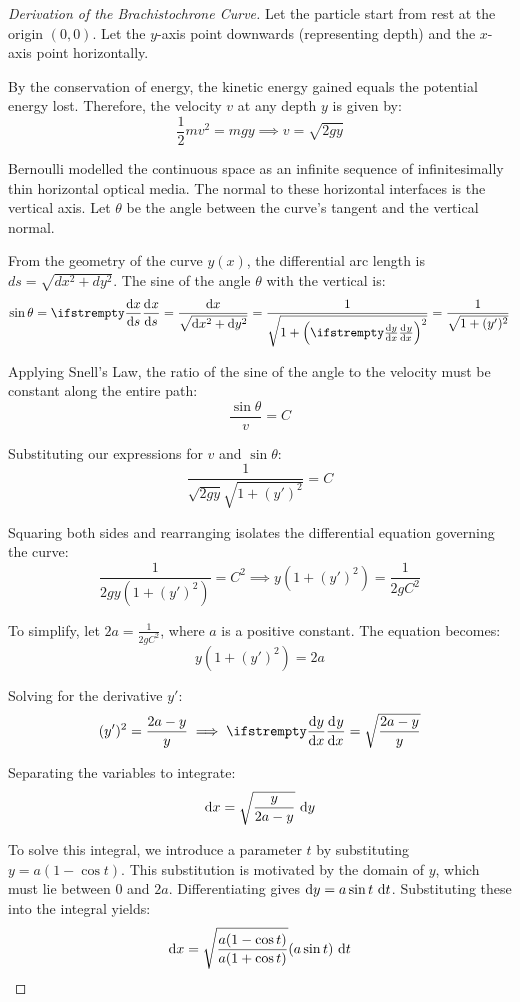 \documentclass[../analysis1.tex]{subfiles}
\begin{document}
\begin{proof}[Derivation of the Brachistochrone Curve]
    Let the particle start from rest at the origin $(0,0)$. Let the $y$-axis point downwards (representing depth) and the $x$-axis point horizontally. 
    
    By the conservation of energy, the kinetic energy gained equals the potential energy lost. Therefore, the velocity $v$ at any depth $y$ is given by:
    \[ \frac{1}{2}mv^2 = mgy \implies v = \sqrt{2gy} \]
    
    Bernoulli modelled the continuous space as an infinite sequence of infinitesimally thin horizontal optical media. The normal to these horizontal interfaces is the vertical axis. Let $\theta$ be the angle between the curve's tangent and the vertical normal. 
    
    From the geometry of the curve $y(x)$, the differential arc length is $ds = \sqrt{dx^2 + dy^2}$. The sine of the angle $\theta$ with the vertical is:
    \[ \sin \theta = \deriv[]{x}{s} = \frac{\d x}{\sqrt{\d x^2 + \d y^2}} = \frac{1}{\sqrt{1 + \left(\deriv[]{y}{x}\right)^2}} = \frac{1}{\sqrt{1 + (y')^2}} \]
    
    Applying Snell's Law, the ratio of the sine of the angle to the velocity must be constant along the entire path:
    \[ \frac{\sin \theta}{v} = C \]
    
    Substituting our expressions for $v$ and $\sin \theta$:
    \[ \frac{1}{\sqrt{2gy} \sqrt{1 + (y')^2}} = C \]
    
    Squaring both sides and rearranging isolates the differential equation governing the curve:
    \[ \frac{1}{2gy(1 + (y')^2)} = C^2 \implies y(1 + (y')^2) = \frac{1}{2gC^2} \]
    
    To simplify, let $2a = \frac{1}{2gC^2}$, where $a$ is a positive constant. The equation becomes:
    \[ y(1 + (y')^2) = 2a \]
    
    Solving for the derivative $y'$:
    \[ (y')^2 = \frac{2a - y}{y} \implies \deriv{y}{x} = \sqrt{\frac{2a - y}{y}} \]
    
    Separating the variables to integrate:
    \[ \d x = \sqrt{\frac{y}{2a - y}} \, \d y \]
    
    To solve this integral, we introduce a parameter $t$ by substituting $y = a(1 - \cos t)$. This substitution is motivated by the domain of $y$, which must lie between $0$ and $2a$. Differentiating gives $\d y = a \sin t \, \d t$. Substituting these into the integral yields:
    \[ \d x = \sqrt{\frac{a(1 - \cos t)}{a(1 + \cos t)}} (a \sin t) \, \d t \]
    

\end{proof}
\end{document}
